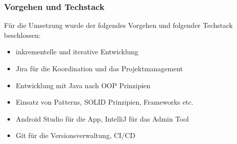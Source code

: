 \begin{frame}
\frametitle{Vorgehen und Techstack}
	Für die Umsetzung wurde der folgendes Vorgehen und folgender Techstack beschlossen:

	\begin{itemize}
		\item inkrementelle und iterative Entwicklung
		\item Jira für die Koordination und das Projektmanagement
		\item Entwicklung mit Java nach OOP Prinzipien
		\item Einsatz von Patterns, SOLID Prinzipien, Frameworks etc. 
		\item Android Studio für die App, IntelliJ für das Admin Tool
		\item Git für die Versionsverwaltung, CI/CD
	\end{itemize}
\end{frame}